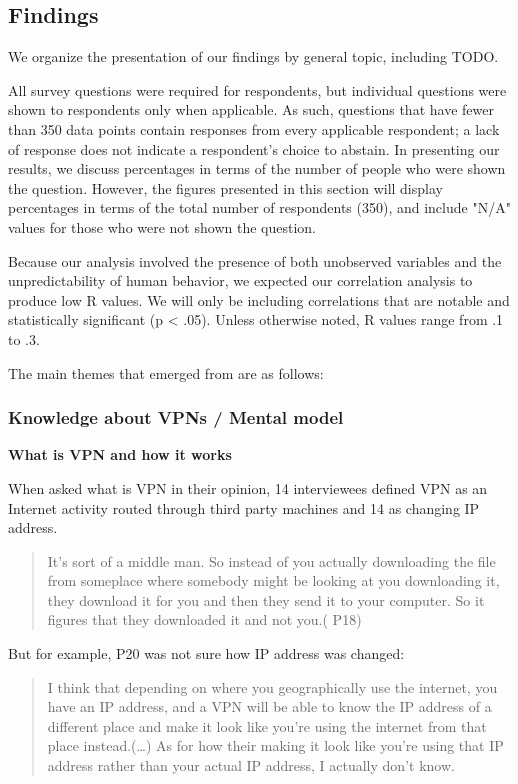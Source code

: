 \subsection{Findings}\label{Findings}

We organize the presentation of our findings by general topic, including TODO.

All survey questions were required for respondents, but individual questions
were shown to respondents only when applicable. As such, questions that have
fewer than 350 data points contain responses from every applicable respondent;
a lack of response does not indicate a respondent's choice to abstain. In
presenting our results, we discuss percentages in terms of the number of
people who were shown the question. However, the figures presented in this
section will display percentages in terms of the total number of respondents
(350), and include "N/A" values for those who were not shown the question.

Because our analysis involved the presence of both unobserved variables and
the unpredictability of human behavior, we expected our correlation analysis
to produce low R values. We will only be including correlations that are
notable and statistically significant (p < .05). Unless otherwise noted, R
values range from .1 to .3.


The main themes that emerged from are as follows: 

\subsubsection{Knowledge about VPNs / Mental model}

\textbf{What is VPN and how it works}

When asked what is VPN in their opinion, 14 interviewees defined VPN as an
Internet activity routed through third party machines and 14 as changing IP
address.  \begin{quote}It's sort of a middle man. So instead of you actually
downloading the file from someplace where somebody might be looking at you
downloading it, they download it for you and then they send it to your
computer. So it figures that they downloaded it and not you.( P18)\end{quote}


But for example, P20 was not sure how IP address was changed: \begin{quote}I
think that depending on where you geographically use the internet, you have an
IP address, and a VPN will be able to know the IP address of a different place
and make it look like you're using the internet from that place
instead.(\dots) As for how their making it look like you're using that IP
address rather than your actual IP address, I actually don't know.\end{quote}



